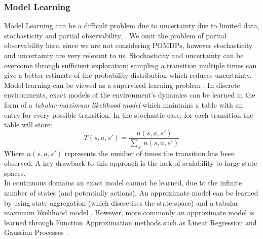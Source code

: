 \subsubsection{Model Learning}
Model Learning can be a difficult problem due to uncertainty due to limited data, stochasticity and partial observability. . We omit the problem of partial observability here, since we are not considering POMDPs, however stochasticity and uncertainty are very relevant to us. Stochasticity and uncertainty can be overcome through sufficient exploration; sampling a transition multiple times can give a better estimate of the probability distribution which reduces uncertainty.
\\Model learning can be viewed as a supervised learning problem \cite{JORDAN1992307}. In discrete environments, exact models of the environment's dynamics can be learned in the form of a \textit{tabular maximum likelihood model} \cite{10.1145/122344.122377} which  maintains a table with an entry for every possible transition.
In the stochastic case, for each transition the table will store:
\begin{equation}
\label{eqn:tmlmupdate}
T(s, a, s') = \frac{n(s, a, s')}{\sum_{s'}n(s,a,s')}
\end{equation}
Where $n(s,a,s')$ represents the number of times the transition has been observed.
A key drawback to this approach is the lack of scalability to large state spaces.
\\In continuous domains an exact model cannot be learned, due to the infinite number of states (and potentially actions). An approximate model can be learned by using state aggregation (which discretises the state space) and a tabular maximum likelihood model \cite{Kuvayev1996ModelBasedRL}.
However, more commonly an approximate model is learned through Function Approximation methods such as Linear Regression \cite{DBLP:journals/corr/abs-1206-3285, NIPS2007_b7bb35b9} and Gaussian Processes \cite{10.5555/3104482.3104541}.


